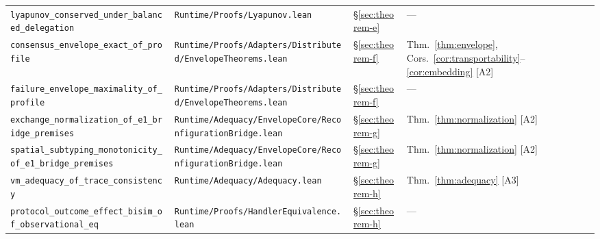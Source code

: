 \documentclass[a4paper,10pt,twocolumn,english]{article}
\numberwithin{equation}{section}
\theoremstyle{paperdef}
\theoremstyle{paperplain}
\theoremstyle{paperdef}
\theoremstyle{paperremark}
\theoremstyle{paperdef}
\begin{document}
\begin{table}[H]
\begin{tabularx}{\textwidth}{L{0.29\textwidth}L{0.37\textwidth}L{0.06\textwidth}>{\raggedright\arraybackslash}X}
		\texttt{lyapunov\_conserved\_\allowbreak under\_balanced\_\allowbreak delegation}            & \texttt{Runtime/\allowbreak Proofs/\allowbreak}\mbox{\texttt{Lyapunov.lean}}                                                      & \S\ref{sec:theorem-e} & ---                                                                                           \\
		\texttt{consensus\_envelope\_\allowbreak exact\_of\_profile}                                 & \texttt{Runtime/\allowbreak Proofs/\allowbreak Adapters/\allowbreak Distributed/\allowbreak}\mbox{\texttt{EnvelopeTheorems.lean}} & \S\ref{sec:theorem-f} & Thm.~\ref{thm:envelope}, Cors.~\ref{cor:transportability}--\ref{cor:embedding} [A2]           \\
		\texttt{failure\_envelope\_\allowbreak maximality\_of\_profile}                              & \texttt{Runtime/\allowbreak Proofs/\allowbreak Adapters/\allowbreak Distributed/\allowbreak}\mbox{\texttt{EnvelopeTheorems.lean}} & \S\ref{sec:theorem-f} & ---                                                                                           \\
		\texttt{exchange\_normalization\_\allowbreak of\_e1\_bridge\_premises}                       & \texttt{Runtime/\allowbreak Adequacy/\allowbreak EnvelopeCore/\allowbreak}\mbox{\texttt{ReconfigurationBridge.lean}}              & \S\ref{sec:theorem-g} & Thm.~\ref{thm:normalization} [A2]                                                             \\
		\texttt{spatial\_subtyping\_\allowbreak monotonicity\_of\_e1\_\allowbreak bridge\_premises}  & \texttt{Runtime/\allowbreak Adequacy/\allowbreak EnvelopeCore/\allowbreak}\mbox{\texttt{ReconfigurationBridge.lean}}              & \S\ref{sec:theorem-g} & Thm.~\ref{thm:normalization} [A2]                                                             \\
		\texttt{vm\_adequacy\_of\_\allowbreak trace\_consistency}                                    & \texttt{Runtime/\allowbreak Adequacy/\allowbreak}\mbox{\texttt{Adequacy.lean}}                                                    & \S\ref{sec:theorem-h} & Thm.~\ref{thm:adequacy} [A3]                                                                  \\
		\texttt{protocol\_outcome\_\allowbreak effect\_bisim\_of\_\allowbreak observational\_eq}     & \texttt{Runtime/\allowbreak Proofs/\allowbreak}\mbox{\texttt{HandlerEquivalence.lean}}                                            & \S\ref{sec:theorem-h} & ---                                                                                           \\

\end{tabularx}
\end{table}
\end{document}
